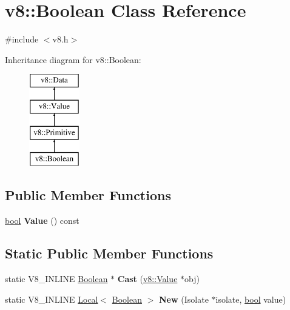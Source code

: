 \hypertarget{classv8_1_1Boolean}{}\section{v8\+:\+:Boolean Class Reference}
\label{classv8_1_1Boolean}


{\ttfamily \#include $<$v8.\+h$>$}

Inheritance diagram for v8\+:\+:Boolean\+:\begin{figure}[H]
\begin{center}
\leavevmode
\includegraphics[height=4.000000cm]{classv8_1_1Boolean}
\end{center}
\end{figure}
\subsection*{Public Member Functions}
\begin{DoxyCompactItemize}
\item 
\mbox{\label{classv8_1_1Boolean_a4d6e813daf80df3710518f5389cb7da5}} 
\mbox{\hyperlink{classbool}{bool}} {\bfseries Value} () const
\end{DoxyCompactItemize}
\subsection*{Static Public Member Functions}
\begin{DoxyCompactItemize}
\item 
\mbox{\label{classv8_1_1Boolean_a92493565c4b9400825a0ff09780d7ff4}} 
static V8\+\_\+\+I\+N\+L\+I\+NE \mbox{\hyperlink{classv8_1_1Boolean}{Boolean}} $\ast$ {\bfseries Cast} (\mbox{\hyperlink{classv8_1_1Value}{v8\+::\+Value}} $\ast$obj)
\item 
\mbox{\label{classv8_1_1Boolean_aeb32aa1bf1853bc4c5f076ee6a8b9a0f}} 
static V8\+\_\+\+I\+N\+L\+I\+NE \mbox{\hyperlink{classv8_1_1Local}{Local}}$<$ \mbox{\hyperlink{classv8_1_1Boolean}{Boolean}} $>$ {\bfseries New} (Isolate $\ast$isolate, \mbox{\hyperlink{classbool}{bool}} value)
\end{DoxyCompactItemize}


